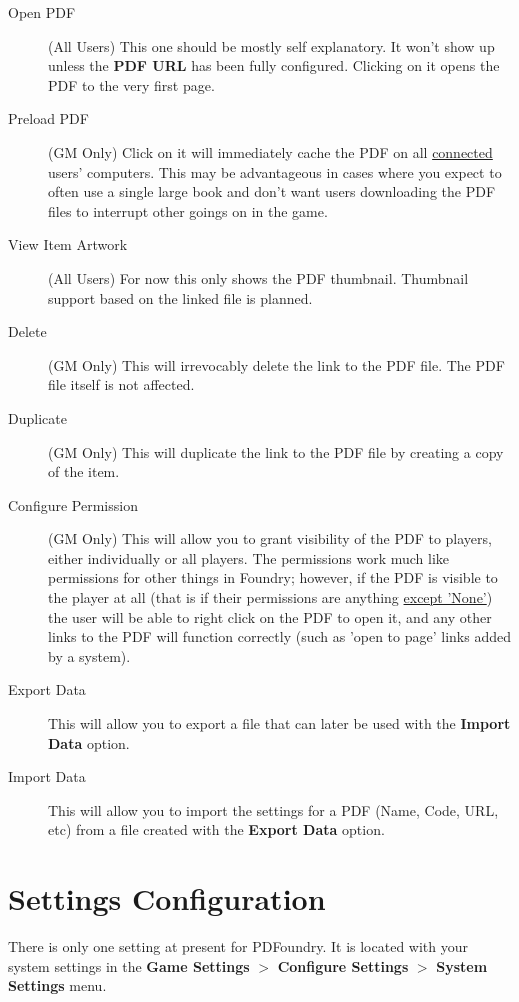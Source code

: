 \documentclass{article}
\begin{document}
    \begin{description}

        \item [Open PDF] (All Users) This one should be mostly self explanatory. It won't show up unless the \textbf{PDF URL} has been fully configured. Clicking on it opens the PDF to the very first page.

        \item [Preload PDF] (GM Only) Click on it will immediately cache the PDF on all \underline{connected} users' computers. This may be advantageous in cases where you expect to often use a single large book and don't want users downloading the PDF files to interrupt other goings on in the game.

        \item [View Item Artwork] (All Users) For now this only shows the PDF thumbnail. Thumbnail support based on the linked file is planned.

        \item [Delete] (GM Only) This will irrevocably delete the link to the PDF file. The PDF file itself is not affected.

        \item [Duplicate] (GM Only) This will duplicate the link to the PDF file by creating a copy of the item.

        \item [Configure Permission] (GM Only) This will allow you to grant visibility of the PDF to players, either individually or all players. The permissions work much like permissions for other things in Foundry; however, if the PDF is visible to the player at all (that is if their permissions are anything \underline{except 'None'}) the user will be able to right click on the PDF to open it, and any other links to the PDF will function correctly (such as 'open to page' links added by a system).

        \item [Export Data] This will allow you to export a file that can later be used with the \textbf{Import Data} option.

        \item [Import Data] This will allow you to import the settings for a PDF (Name, Code, URL, etc) from a file created with the \textbf{Export Data} option.

    \end{description}

    \section{Settings Configuration}
    There is only one setting at present for PDFoundry. It is located with your system settings in the \textbf{Game Settings} $>$ \textbf{Configure Settings} $>$ \textbf{System Settings} menu.
\end{document}
